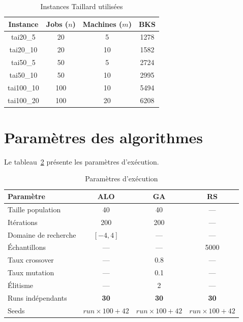 \documentclass[12pt,a4paper,twoside]{report}
\begin{document}
\begin{table}[H]
\centering
{}
\caption{Instances Taillard utilisées}
\label{tab:instances}
\begin{tabular}{cccc}
\toprule
\rowcolor{TableHeader}
\color{white}Instance & \color{white}Jobs ($n$) & \color{white}Machines ($m$) & \color{white}BKS \\
\midrule
tai20\_5  & 20  & 5   & 1278 \\
tai20\_10 & 20  & 10  & 1582 \\
tai50\_5  & 50  & 5   & 2724 \\
tai50\_10 & 50  & 10  & 2995 \\
tai100\_10 & 100 & 10  & 5494 \\
tai100\_20 & 100 & 20  & 6208 \\
\bottomrule
\end{tabular}
\end{table}

\section{Paramètres des algorithmes}

Le tableau~\ref{tab:params} présente les paramètres d'exécution.

\begin{table}[H]
\centering
{}
\caption{Paramètres d'exécution}
\label{tab:params}
\begin{tabular}{lccc}
\toprule
\rowcolor{TableHeader}
\color{white}Paramètre & \color{white}ALO & \color{white}GA & \color{white}RS \\
\midrule
Taille population & 40 & 40 & --- \\
Itérations & 200 & 200 & --- \\
Domaine de recherche & $[-4, 4]$ & --- & --- \\
Échantillons & --- & --- & 5000 \\
Taux crossover & --- & 0.8 & --- \\
Taux mutation & --- & 0.1 & --- \\
Élitisme & --- & 2 & --- \\
Runs indépendants & \textbf{30} & \textbf{30} & \textbf{30} \\
Seeds & $run \times 100 + 42$ & $run \times 100 + 42$ & $run \times 100 + 42$ \\
\bottomrule
\end{tabular}
\end{table}
\end{document}
